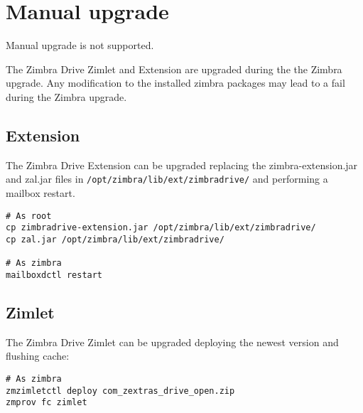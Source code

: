 \section{Manual upgrade}

\begin{warning}
    Manual upgrade is not supported.

    The Zimbra Drive Zimlet and Extension are upgraded during the the Zimbra upgrade.
    Any modification to the installed zimbra packages may lead to a fail during the Zimbra upgrade.
\end{warning}

\subsection{Extension}
The Zimbra Drive Extension can be upgraded replacing the zimbra-extension.jar and zal.jar files in \texttt{/opt/zimbra/lib/ext/zimbradrive/} and performing a mailbox restart.
\begin{verbatim}
# As root
cp zimbradrive-extension.jar /opt/zimbra/lib/ext/zimbradrive/
cp zal.jar /opt/zimbra/lib/ext/zimbradrive/

# As zimbra
mailboxdctl restart
\end{verbatim}

\subsection{Zimlet}
The Zimbra Drive Zimlet can be upgraded deploying the newest version and flushing cache:
\begin{verbatim}
# As zimbra
zmzimletctl deploy com_zextras_drive_open.zip
zmprov fc zimlet
\end{verbatim}

